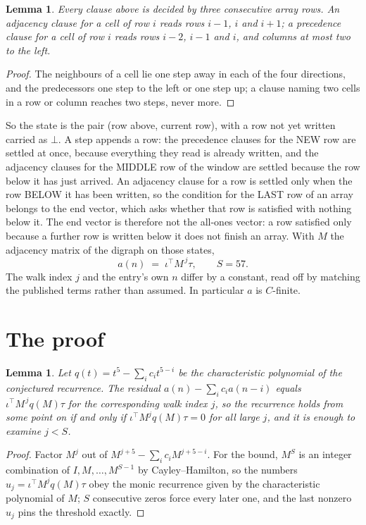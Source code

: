 \documentclass[11pt,a4paper]{article}
\theoremstyle{plain}
\newtheorem{lemma}[theorem]{Lemma}
\theoremstyle{definition}
\begin{document}
\begin{lemma}\label{lem:win}
Every clause above is decided by three consecutive array rows. An adjacency clause for a cell
of row $i$ reads rows $i-1$, $i$ and $i+1$; a precedence clause for a cell of row $i$ reads
rows $i-2$, $i-1$ and $i$, and columns at most two to the left.
\end{lemma}

\begin{proof}
The neighbours of a cell lie one step away in each of the four directions, and the predecessors
one step to the left or one step up; a clause naming two cells in a row or column reaches two
steps, never more.
\end{proof}

So the state is the pair (row above, current row), with a row not yet written carried as
$\bot$. A step appends a row: the precedence clauses for the NEW row are settled at once,
because everything they read is already written, and the adjacency clauses for the MIDDLE row
of the window are settled because the row below it has just arrived. An adjacency clause for a row is settled only when the row BELOW it has been
written, so the condition for the LAST row of an array belongs to the end vector, which asks
whether that row is satisfied with nothing below it. The end vector is therefore not the
all-ones vector: a row satisfied only because a further row is written below it does not
finish an array. With $M$ the
adjacency matrix of the digraph on those states,
\[
a(n)\;=\;\iota^{\!\top}M^{\,j}\tau ,\qquad S=57.
\]
The walk index $j$ and the entry's own $n$ differ by a constant, read off by matching the
published terms rather than assumed. In particular $a$ is $C$-finite.

\section{The proof}

\begin{lemma}\label{lem:crit}
Let $q(t)=t^{5}-\sum_i c_it^{5-i}$ be the characteristic polynomial of the
conjectured recurrence. The residual $a(n)-\sum_ic_ia(n-i)$ equals
$\iota^{\!\top}M^{\,j}q(M)\tau$ for the corresponding walk index $j$, so the recurrence
holds from some point on if and only if $\iota^{\!\top}M^{j}q(M)\tau=0$ for all large $j$,
and it is enough to examine $j<S$.
\end{lemma}

\begin{proof}
Factor $M^{j}$ out of $M^{j+5}-\sum_ic_iM^{j+5-i}$. For the bound, $M^{S}$
is an integer combination of $I,M,\dots,M^{S-1}$ by Cayley--Hamilton, so the numbers
$u_j=\iota^{\!\top}M^{j}q(M)\tau$ obey the monic recurrence given by the characteristic
polynomial of $M$; $S$ consecutive zeros force every later one, and the last nonzero $u_j$
pins the threshold exactly.
\end{proof}
\end{document}
